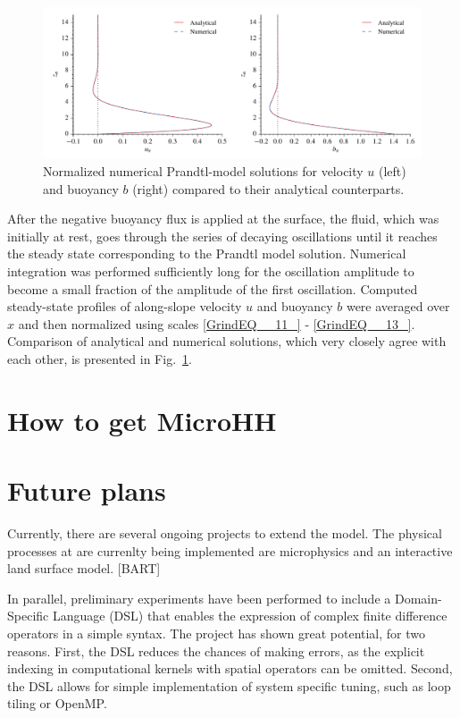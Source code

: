 \documentclass[gmd]{copernicus}
\begin{document}
\begin{figure}[t]
\vspace*{2mm}
\begin{center}
\includegraphics[width=16.6cm]{figs/prandtl.pdf}
\end{center}
\caption{Normalized numerical Prandtl-model solutions for velocity $u$ (left) and buoyancy $b$ (right) compared to their analytical counterparts.}
\label{prandtl}
\end{figure}

After the negative buoyancy flux is applied at the surface, the fluid, which was initially at rest, goes through the series of decaying oscillations until it reaches the steady state corresponding to the Prandtl model solution. Numerical integration was performed sufficiently long for the oscillation amplitude to become a small fraction of the amplitude of the first oscillation. Computed steady-state profiles of along-slope velocity $u$ and buoyancy $b$ were averaged over $x$ and then normalized using scales \eqref{GrindEQ__11_} - \eqref{GrindEQ__13_}. Comparison of analytical and numerical solutions, which very closely agree with each other, is presented in Fig.~\ref{prandtl}.

\section{How to get MicroHH} \label{sec:howto}

\section{Future plans}
Currently, there are several ongoing projects to extend the model. The physical processes at are currenlty being implemented are microphysics and an interactive land surface model. [BART]

In parallel, preliminary experiments have been performed to include a Domain-Specific Language (DSL) that enables the expression of complex finite difference operators in a simple syntax. The project has shown great potential, for two reasons. First, the DSL reduces the chances of making errors, as the explicit indexing in computational kernels with spatial operators can be omitted. Second, the DSL allows for simple implementation of system specific tuning, such as loop tiling or OpenMP.
\end{document}
